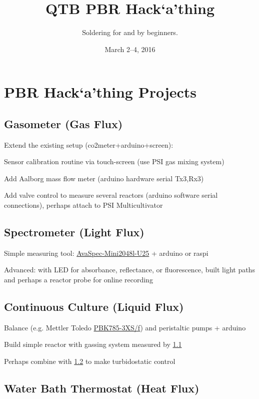 \documentclass[12pt,a4paper]{scrartcl}
\title{QTB PBR Hack`a'thing}
\subtitle{Soldering for and by beginners.}
\date{March 2--4, 2016}
\begin{document}
\maketitle
\tableofcontents
\newpage

\section{PBR Hack`a'thing Projects}
\label{proj}

\subsection{Gasometer (Gas Flux)}
\label{gas}

Extend the existing setup (co2meter+arduino+screen): 

Sensor calibration routine via touch-screen (use PSI gas mixing system) 

Add Aalborg mass flow meter (arduino hardware serial Tx3,Rx3)  

Add valve control to measure several reactors (arduino software serial
connections), perhaps attach to PSI Multicultivator

\subsection{Spectrometer (Light Flux)} 
\label{spec}

Simple measuring tool: \href{http://www.avantes.com/products/spectrometers/compactline/item/723-avaspec-mini}{AvaSpec-Mini2048l-U25} + arduino or raspi

Advanced: with LED for absorbance, reflectance, or fluorescence,
built light paths and perhaps a reactor probe for online recording

\subsection{Continuous Culture (Liquid Flux)} 
\label{cult}

Balance (e.g. Mettler Toledo \href{http://de.mt.com/de/de/home/products/Industrial_Weighing_Solutions/bench-scales/weighing-platforms/high-resolution/PBK785.html}{PBK785-3XS/f}) and peristaltic pumps + arduino

Build simple reactor with gassing system measured by \ref{gas}

Perhaps combine with \ref{spec} to make turbidostatic control

\subsection{Water Bath Thermostat (Heat Flux)}
\label{heat}
\end{document}
